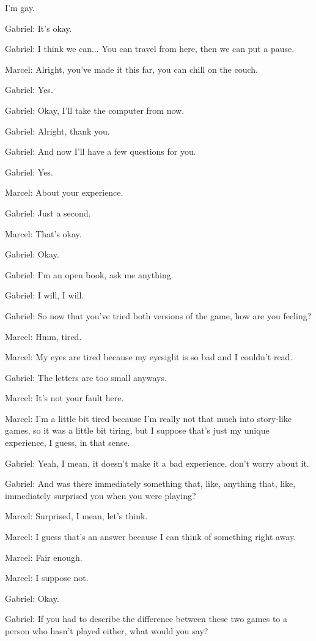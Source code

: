 I'm gay.

Gabriel: It's okay.

Gabriel: I think we can... You can travel from here, then we can put a pause.

Marcel: Alright, you've made it this far, you can chill on the couch.

Gabriel: Yes.

Gabriel: Okay, I'll take the computer from now.

Gabriel: Alright, thank you.

Gabriel: And now I'll have a few questions for you.

Gabriel: Yes.

Marcel: About your experience.

Gabriel: Just a second.

Marcel: That's okay.

Gabriel: Okay.

Gabriel: I'm an open book, ask me anything.

Gabriel: I will, I will.

Gabriel: So now that you've tried both versions of the game, how are you feeling?

Marcel: Hmm, tired.

Marcel: My eyes are tired because my eyesight is so bad and I couldn't read.

Gabriel: The letters are too small anyways.

Marcel: It's not your fault here.

Marcel: I'm a little bit tired because I'm really not that much into story-like games, so it was a little bit tiring, but I suppose that's just my unique experience, I guess, in that sense.

Gabriel: Yeah, I mean, it doesn't make it a bad experience, don't worry about it.

Gabriel: And was there immediately something that, like, anything that, like, immediately surprised you when you were playing?

Marcel: Surprised, I mean, let's think.

Marcel: I guess that's an answer because I can think of something right away.

Marcel: Fair enough.

Marcel: I suppose not.

Gabriel: Okay.

Gabriel: If you had to describe the difference between these two games to a person who hasn't played either, what would you say?

